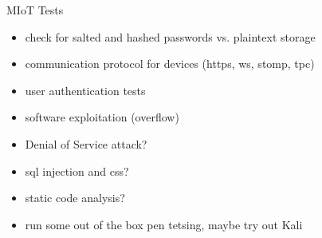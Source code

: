 \documentclass{article}
\begin{document}
\begin{center}
\LARGE MIoT Tests
\end{center}
\begin{itemize}
\item check for salted and hashed passwords vs. plaintext storage
\item communication protocol for devices (https, ws, stomp, tpc) 
\item user authentication tests
\item software exploitation (overflow)
\item Denial of Service attack?
\item sql injection and css?
\item static code analysis?
\item run some out of the box pen tetsing, maybe try out Kali
\end{itemize}
\end{document}
